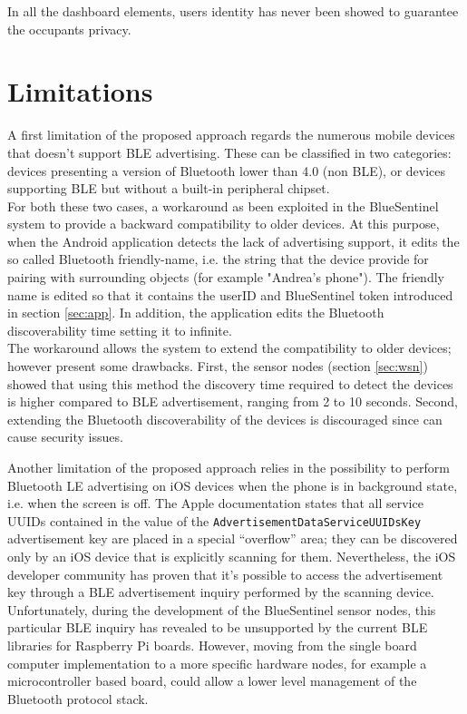 In all the dashboard elements, users identity has never been showed to guarantee the occupants privacy.


\section{Limitations}
\label{sec:limitations}
A first limitation of the proposed approach regards the numerous mobile devices that doesn't support BLE advertising. These can be classified in two categories: devices presenting a version of Bluetooth lower than 4.0 (non BLE), or devices supporting BLE but without a built-in peripheral chipset.\\
For both these two cases, a workaround as been exploited in the BlueSentinel system to provide a backward compatibility to older devices. At this purpose, when the Android application detects the lack of advertising support, it edits the so called Bluetooth friendly-name, i.e. the string that the device provide for pairing with surrounding objects (for example "Andrea's phone"). The friendly name is edited so that it contains the userID and BlueSentinel token introduced in section \ref{sec:app}. In addition, the application edits the Bluetooth discoverability time setting it to infinite.\\
The workaround allows the system to extend the compatibility to older devices; however present some drawbacks. First, the sensor nodes (section \ref{sec:wsn}) showed that using this method the discovery time required to detect the devices is higher compared to BLE advertisement, ranging from 2 to 10 seconds. Second, extending the Bluetooth discoverability of the devices is discouraged since can cause security issues.

\smallskip
Another limitation of the proposed approach relies in the possibility to perform Bluetooth LE advertising on iOS devices when the phone is in background state, i.e. when the screen is off.
The Apple documentation states that all service UUIDs contained in the value of the \verb|AdvertisementDataServiceUUIDsKey| advertisement key are placed in a special “overflow” area; they can be discovered only by an iOS device that is explicitly scanning for them. Nevertheless, the iOS developer community has proven that it's possible to access the advertisement key through a BLE advertisement inquiry performed by the scanning device. Unfortunately, during the development of the BlueSentinel sensor nodes, this particular BLE inquiry has revealed to be unsupported by the current BLE libraries for Raspberry Pi boards. However, moving from the single board computer implementation to a more specific hardware nodes, for example a microcontroller based board, could allow a lower level management of the Bluetooth protocol stack.

